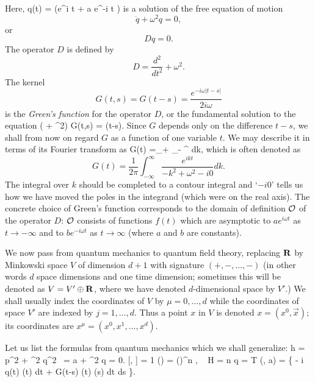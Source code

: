 Here, 
\beq \label{e:16}
q(t) = \normfac (\astar e^{i \omega t} + a e^{-i \omega t} ) \eeq
is a solution of the free equation of motion 
$$\ddot{q} + \omega^2 q = 0,  $$
or $$D q = 0 . $$
The operator $D$ is defined by 
$$D = \frac{d^2}{dt^2} + \omega^2. $$
The kernel 
$$ G(t,s)= G(t-s) = \frac{e^{-i \omega |t-s|} }{2 i \omega} $$
is 
the {\em Green's function}  for the operator $D$, or the fundamental 
solution to the equation 
\beq  ( + \omega^2) G(t,s) = \delta (t-s).\eeq
Since $G$ depends only on the difference $t-s$, we shall from now
on regard $G$ as a function of one variable $t$.
We may describe it in terms of its  Fourier transform as
\beq G(t) =\lim_{\eps {}+}   \int_{- \infty}^\infty 
{} dk, \eeq
which is often denoted as 
$$ G(t) =  \frac{1}{2 \pi} \int_{- \infty}^\infty 
\frac{e^{ikt} }{- k^2 + \omega^2 - i 0} dk. $$
The integral over $k$ should be completed to a contour integral 
and `$- i 0$' tells us how we have moved the poles in the integrand
(which were on the real axis). The concrete choice of Green's function
corresponds to the domain of definition ${\mbox{$\cal O$}}$ 
of the operator $D$: ${\mbox{$\cal O$}}$ consists of functions $f(t)$ which 
are asymptotic  to  $a e^{i \omega t}$  as
$t \to - \infty$ and to  $b e^{-i \omega t}$ as
$t \to \infty$ (where $a$ and $b$ are constants). 

We now pass from quantum mechanics to quantum field theory, replacing
${{\bf R }}$ by Minkowski  space $V$ of dimension $d + 1$
with signature $(+,-,\dots, -)$ (in other words $d$ space 
dimensions and one time dimension; sometimes this will 
be denoted as $V = V' \oplus {{\bf R }}$, where we have
denoted $d$-dimensional space by $V'$.) 
We shall usually index the coordinates of $V$ by $\mu = 0, \dots, d$ while
the coordinates of space $V'$  are indexed by $j = 1, \dots, d$. 
Thus a point $x$ in $V$ is denoted $x = (x^0, \vec{x})$; its
coordinates are $x^\mu = (x^0, x^1, \dots, x^d)$. 

Let us list  the formulas 
from quantum mechanics which we shall generalize:
\beq \label{eq:1} h = \half p^2 + \half \omega^2 q^2 ~= \omega \astar a \eeq
\beq  \label{eq:2}  + \omega^2 q = 0. \eeq
\beq \label{eq:2a} [\hata, \hatastar] = 1 \eeq
\beq \label{eq:3} \phi(\astar) =  (\astar)^n , 
~ H \phi = n \omega \phi \eeq
\beq \label{eq:4} q =  \eeq
\beq \label{eq:5} T (\astar, a) = \exp \left \{ 
- i \int q(t) \eta(t) dt +  \int G(t-s) \eta(t) \eta(s) dt ds 
\right \}. \eeq




